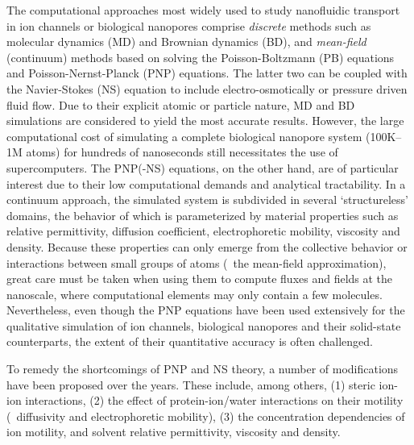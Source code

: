 \documentclass[journal=ancac3,manuscript=article,etalmode=truncate,maxauthors=0,layout=onecolumn]{achemso}
\begin{document}
The computational approaches most widely used to study nanofluidic transport in ion channels or biological
nanopores comprise \emph{discrete} methods such as molecular dynamics
(MD)\cite{Lynden-Bell-1996,Allen-1999,Aksimentiev-2005,Luan-2008,Bhattacharya-2011,Zhang-2014,DiMarino-2015,Belkin-2016}
and Brownian dynamics
(BD),\cite{Schirmer-1999,Im-2002,Noskov-2004,Millar-2008,Egwolf-2010,DeBiase-2015,Pederson-2015} and
\emph{mean-field} (continuum) methods based on solving the Poisson-Boltzmann (PB)
equations\cite{Grochowski-2008, Baldessari-2008-1} and Poisson-Nernst-Planck (PNP)
equations.\cite{Eisenberg-1996,Gillespie-2002, Simakov-2010} The latter two can be coupled with the
Navier-Stokes (NS) equation to include electro-osmotically or pressure driven fluid
flow.\cite{Lu-2012,Pederson-2015} Due to their explicit atomic or particle nature, MD and BD simulations are
considered to yield the most accurate results. However, the large computational cost of simulating a complete
biological nanopore system (100K--1M atoms) for hundreds of nanoseconds still necessitates the use of
supercomputers.\cite{Aksimentiev-2005,Bhattacharya-2011,Wilson-2019} The PNP(-NS) equations, on the other
hand, are of particular interest due to their low computational demands and analytical tractability. In a
continuum approach, the simulated system is subdivided in several `structureless' domains, the behavior of
which is parameterized by material properties such as relative permittivity, diffusion coefficient,
electrophoretic mobility, viscosity and density. Because these properties can only emerge from the collective
behavior or interactions between small groups of atoms (\ie~the mean-field approximation), great care must be
taken when using them to compute fluxes and fields at the nanoscale, where computational elements may only
contain a few molecules.\cite{Corry-2000,Collins-2012} Nevertheless, even though the PNP equations have been
used extensively for the qualitative simulation of ion channels,\cite{Im-2002,Furini-2006,Liu-2015} biological
nanopores\cite{Simakov-2010,Pederson-2015,Aguilella-Arzo-2017,Simakov-2018} and their solid-state
counterparts,\cite{Cervera-2005,White-2008,Chaudhry-2014,Laohakunakorn-2015} the extent of their quantitative
accuracy is often challenged.\cite{Corry-2000,Collins-2012,Maffeo-2012,Thomas-2014,Kim-2015}

To remedy the shortcomings of PNP and NS theory, a number of modifications have been proposed over the years.
These include, among others, (1) steric ion-ion interactions, (2) the effect of protein-ion/water interactions
on their motility (\ie~diffusivity and electrophoretic mobility), (3) the concentration dependencies of ion
motility, and solvent relative permittivity, viscosity and density.
\end{document}
